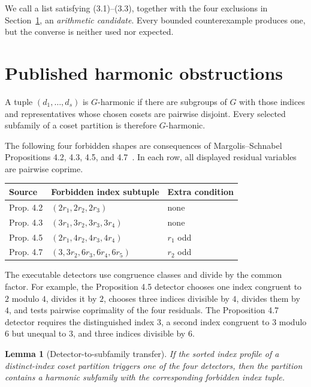 \documentclass[11pt]{article}
\newtheorem{lemma}[theorem]{Lemma}
\theoremstyle{definition}
\begin{document}
We call a list satisfying (3.1)--(3.3), together with the four exclusions in
Section~\ref{sec:harmonic}, an \emph{arithmetic candidate}. Every bounded
counterexample produces one, but the converse is neither used nor expected.

\section{Published harmonic obstructions}\label{sec:harmonic}

A tuple $(d_1,\ldots,d_s)$ is $G$-harmonic if there are subgroups of $G$ with
those indices and representatives whose chosen cosets are pairwise disjoint.
Every selected subfamily of a coset partition is therefore $G$-harmonic.

The following four forbidden shapes are consequences of
Margolis--Schnabel Propositions 4.2, 4.3, 4.5, and 4.7~\cite{MS19}. In each
row, all displayed residual variables are pairwise coprime.

\begin{center}
\begin{tabular}{@{}lll@{}}
\toprule
Source & Forbidden index subtuple & Extra condition \\
\midrule
Prop. 4.2 & $(2r_1,2r_2,2r_3)$ & none \\
Prop. 4.3 & $(3r_1,3r_2,3r_3,3r_4)$ & none \\
Prop. 4.5 & $(2r_1,4r_2,4r_3,4r_4)$ & $r_1$ odd \\
Prop. 4.7 & $(3,3r_2,6r_3,6r_4,6r_5)$ & $r_2$ odd \\
\bottomrule
\end{tabular}
\end{center}

The executable detectors use congruence classes and divide by the common
factor. For example, the Proposition 4.5 detector chooses one index congruent
to $2$ modulo $4$, divides it by $2$, chooses three indices divisible by $4$,
divides them by $4$, and tests pairwise coprimality of the four residuals.
The Proposition 4.7 detector requires the distinguished index $3$, a second
index congruent to $3$ modulo $6$ but unequal to $3$, and three indices
divisible by $6$.

\begin{lemma}[Detector-to-subfamily transfer]\label{lem:detector-transfer}
If the sorted index profile of a distinct-index coset partition triggers one
of the four detectors, then the partition contains a harmonic subfamily with
the corresponding forbidden index tuple.
\end{lemma}
\end{document}
